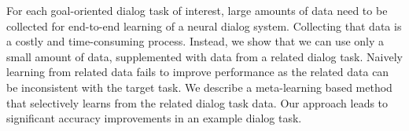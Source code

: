 For each goal-oriented dialog task of interest, large amounts of data need to be collected for end-to-end learning of a neural dialog system. Collecting that data is a costly and time-consuming process. Instead, we show that we can use only a small amount of data, supplemented with data from a related dialog task. Naively learning from related data fails to improve performance as the related data can be inconsistent with the target task. We describe a meta-learning based method that selectively learns from the related dialog task data. Our approach leads to significant accuracy improvements in an example dialog task.
